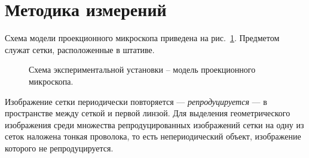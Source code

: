 \documentclass[a4paper, 12pt]{article}
\begin{document}
\section{Методика измерений}

Схема модели проекционного микроскопа приведена на рис.~\ref{ris:ustanovka}. Предметом служат сетки, расположенные в штативе.
	\begin{figure}[H]
		\caption{Схема экспериментальной установки -- модель проекционного микроскопа.}
		\label{ris:ustanovka}
	\end{figure}
	Изображение сетки периодически повторяется --- \textit{репродуцируется} --- в пространстве между сеткой и первой линзой. Для выделения геометрического изображения среди множества репродуцированных изображений сетки на одну из сеток наложена тонкая проволока, то есть непериодический объект, изображение которого не репродуцируется.
  	
\end{document}
